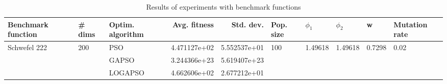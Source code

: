 \begin{table}
\centering
\caption{Results of experiments with benchmark functions}
\begin{tabular}{lllrrlllll}
\toprule
           Benchmark function &              \# dims & Optim. algorithm &  Avg. fitness &    Std. dev. &            Pop. size &               $\phi_{1}$ &               $\phi_{2}$ &                       w &         Mutation rate \\
\midrule
\multirow{3}{*}{Schwefel 222} & \multirow{3}{*}{200} &              PSO &  4.471127e+02 & 5.552537e+01 & \multirow{3}{*}{100} & \multirow{3}{*}{1.49618} & \multirow{3}{*}{1.49618} & \multirow{3}{*}{0.7298} & \multirow{3}{*}{0.02} \\
                              &                      &            GAPSO &  3.244366e+23 & 5.619407e+23 &                      &                          &                          &                         &                       \\
                              &                      &          LOGAPSO &  4.662606e+02 & 2.677212e+01 &                      &                          &                          &                         &                       \\
\bottomrule
\end{tabular}
\end{table}
